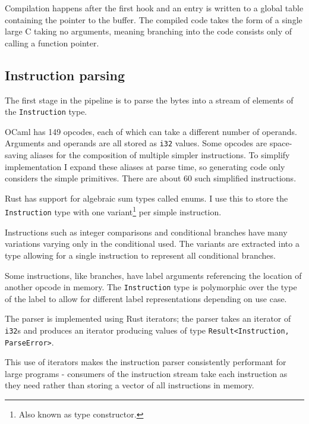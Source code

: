 Compilation happens after the first hook and an entry is written to a global table containing the
pointer to the buffer. The compiled code takes the form of a single large C taking no
arguments, meaning branching into the code consists only of calling a function pointer.

\subsection{Instruction parsing}

The first stage in the pipeline is to parse the bytes into a stream of elements of the
\texttt{Instruction} type.

\label{instruction-type}

OCaml has 149 opcodes, each of which can take a different number of operands. Arguments and
operands
are all stored as \texttt{i32} values. Some opcodes are space-saving aliases for the composition of
multiple simpler instructions. To simplify implementation I expand these aliases at parse time, so
generating code only considers the simple primitives. There are about 60 such simplified
instructions.

Rust has support for algebraic sum types called enums. I use this to store the \texttt{Instruction}
type with one variant\footnote{Also known as type constructor.} per simple instruction.

Instructions such as integer comparisons and conditional branches have many variations varying only
in the conditional used. The variants are extracted into a type allowing for a single instruction
to represent all conditional branches.

Some instructions, like branches, have label arguments referencing the location of another opcode
in
memory. The \texttt{Instruction} type is polymorphic over the type of the label to allow for
different label representations depending on use case.


The parser is implemented using Rust iterators; the parser takes an iterator of \texttt{i32}s and
produces an iterator producing values of type \texttt{Result<Instruction, ParseError>}.

This use of iterators makes the instruction parser consistently performant for large programs -
consumers of the instruction stream take each instruction as they need rather than storing
a vector of all instructions in memory.

